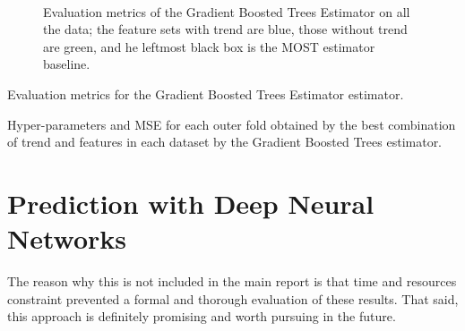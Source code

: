 \documentclass[a4paper]{book}
\begin{document}
\begin{figure}[h]
\hfill
{}\\

    \caption{Evaluation metrics of the Gradient Boosted Trees Estimator on all the data; the feature sets with trend are blue, those without trend are green, and he leftmost black box is the MOST estimator baseline.}
	\label{fig:gbr_results_all}
\end{figure}


\begin{table}[h]
\caption{Evaluation metrics for the Gradient Boosted Trees Estimator estimator.}
\label{tbl:gbr_results}

\end{table}


\begin{table}
\caption{Hyper-parameters and MSE for each outer fold obtained by the best combination of trend and features in each dataset by the Gradient Boosted Trees estimator.}
\label{tbl:params_gbt}

\end{table}



\chapter{Prediction with Deep Neural Networks}
The reason why this is not included in the main report is that time and resources constraint prevented a formal and thorough evaluation of these results. That said, this approach is definitely promising and worth pursuing in the future.
\end{document}
